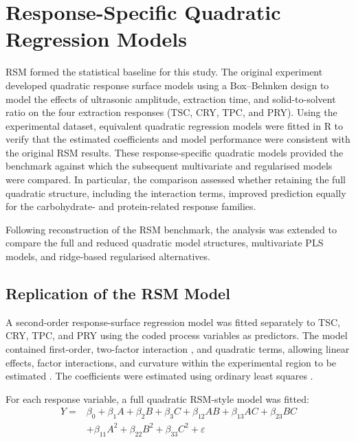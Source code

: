 \documentclass[MScDSA]{uccthesis}
\begin{document}
\section{Response-Specific Quadratic Regression Models}
\label{sec:response_specific_quad_regression}
RSM formed the statistical baseline for this study. The original experiment developed quadratic response surface models using a Box--Behnken design to model the effects of ultrasonic amplitude, extraction time, and solid-to-solvent ratio on the four extraction responses (TSC, CRY, TPC, and PRY). Using the experimental dataset, equivalent quadratic regression models were fitted in R to verify that the estimated coefficients and model performance were consistent with the original RSM results. These response-specific quadratic models provided the benchmark against which the subsequent multivariate and regularised models were compared. In particular, the comparison assessed whether retaining the full quadratic structure, including the interaction terms, improved prediction equally for the carbohydrate- and protein-related response families.

Following reconstruction of the RSM benchmark, the analysis was extended to compare the full and reduced quadratic model structures, multivariate PLS models, and ridge-based regularised alternatives.

\subsection{Replication of the RSM Model}
\label{sec:rsm_replication}
A second-order response-surface regression model was fitted separately to TSC, CRY, TPC, and PRY using the coded process variables as predictors. The model contained first-order, two-factor interaction , and quadratic terms, allowing linear effects, factor interactions, and curvature within the experimental region to be estimated \parencite{Montgomery:2017}. The coefficients were estimated using ordinary least squares \parencite{Draper:1998}.

For each response variable, a full quadratic RSM-style model was fitted:
\begin{equation}
\begin{aligned}
Y = {}& \beta_0 + \beta_1 A + \beta_2 B + \beta_3 C + \beta_{12}AB + \beta_{13}AC + \beta_{23}BC \\
&+ \beta_{11}A^2 + \beta_{22}B^2 + \beta_{33}C^2 
+\varepsilon
\end{aligned}
\label{eq:full_quadratic_model}
\end{equation}
\end{document}
